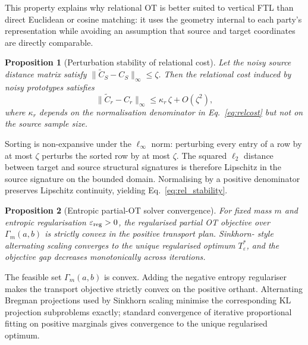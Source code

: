 \documentclass[a4paper,fleqn]{cas-sc}
\newtheorem{proposition}{Proposition}
\begin{document}
This property explains why relational OT is better suited to vertical FTL
than direct Euclidean or cosine matching: it uses the geometry internal to
each party's representation while avoiding an assumption that source and
target coordinates are directly comparable.

\begin{proposition}[Perturbation stability of relational cost]
  Let the noisy source distance matrix satisfy
  $\|\tilde C_S-C_S\|_{\infty}\leq \zeta$. Then the relational cost induced by
  noisy prototypes satisfies
  \begin{equation}
    \|\tilde C_r-C_r\|_{\infty}
    \leq \kappa_r\,\zeta + O(\zeta^2),
    \label{eq:rel_stability}
  \end{equation}
  where $\kappa_r$ depends on the normalisation denominator in
  Eq.~\eqref{eq:relcost} but not on the source sample size.
  \label{prop:rel_stability}
\end{proposition}

\begin{pf}
  Sorting is non-expansive under the $\ell_\infty$ norm: perturbing every
  entry of a row by at most $\zeta$ perturbs the sorted row by at most
  $\zeta$. The squared $\ell_2$ distance between target and source structural
  signatures is therefore Lipschitz in the source signature on the bounded
  domain. Normalising by a positive denominator preserves Lipschitz continuity,
  yielding Eq.~\eqref{eq:rel_stability}.
\end{pf}

\begin{proposition}[Entropic partial-OT solver convergence]
  For fixed mass $m$ and entropic regularisation
  $\varepsilon_{\rm reg}>0$, the regularised partial OT objective over
  $\Gamma_m(a,b)$ is strictly convex in the positive transport plan. Sinkhorn-
  style alternating scaling converges to the unique regularised optimum
  $T_\varepsilon^*$, and the objective gap decreases monotonically across
  iterations.
  \label{prop:pot_convergence}
\end{proposition}

\begin{pf}
  The feasible set $\Gamma_m(a,b)$ is convex. Adding the negative entropy
  regulariser makes the transport objective strictly convex on the positive
  orthant. Alternating Bregman projections used by Sinkhorn scaling minimise
  the corresponding KL projection subproblems exactly; standard convergence of
  iterative proportional fitting on positive marginals gives convergence to
  the unique regularised optimum.
\end{pf}
\end{document}
